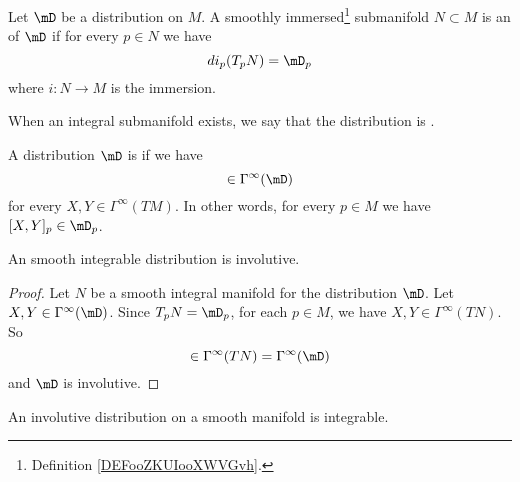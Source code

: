 \begin{definition}
    Let \( \mD\) be a distribution on \( M\). A smoothly immersed\footnote{Definition \ref{DEFooZKUIooXWVGvh}.} submanifold \( N\subset M\) is an  of \( \mD\) if for every \( p\in N\) we have
    \begin{equation}
        di_p(T_pN)=\mD_p
    \end{equation}
    where \( i\colon N\to M\) is the immersion.

    When an integral submanifold exists, we say that the distribution is .
\end{definition}

\begin{definition}
    A distribution \( \mD\) is  if we have
    \begin{equation}
        [X,Y]\in \Gamma^{\infty}(\mD)
    \end{equation}
    for every \( X,Y\in \Gamma^{\infty}(TM)\). In other words, for every \( p\in M\) we have \( [X,Y]_p\in \mD_p\).
\end{definition}

\begin{proposition}     \label{PROPooDYJNooAwnaFK}
    An smooth integrable distribution is involutive.
\end{proposition}

\begin{proof}
    Let \( N\) be a smooth integral manifold for the distribution \( \mD\).  Let \( X,Y\in\Gamma^{\infty}(\mD)\). Since \( T_pN=\mD_p\), for each \( p\in M\), we have \( X,Y\in\Gamma^{\infty}(TN)\). So
    \begin{equation}
        [X,Y]\in\Gamma^{\infty}(TN)=\Gamma^{\infty}(\mD)
    \end{equation}
    and \( \mD\) is involutive.
\end{proof}

\begin{theorem}        \label{THOooDVBHooGRhuGl}
    An involutive distribution on a smooth manifold is integrable.
\end{theorem}

